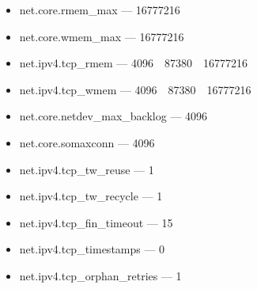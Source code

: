 \begin{itemize}
\item net.core.rmem\_max --- 16777216
\item net.core.wmem\_max --- 16777216 
\item net.ipv4.tcp\_rmem --- 4096~\, 87380~\, 16777216
\item net.ipv4.tcp\_wmem --- 4096~\, 87380~\, 16777216
\item net.core.netdev\_max\_backlog --- 4096
\item net.core.somaxconn --- 4096
\item net.ipv4.tcp\_tw\_reuse --- 1
\item net.ipv4.tcp\_tw\_recycle --- 1
\item net.ipv4.tcp\_fin\_timeout --- 15
\item net.ipv4.tcp\_timestamps --- 0
\item net.ipv4.tcp\_orphan\_retries --- 1
\end{itemize}

